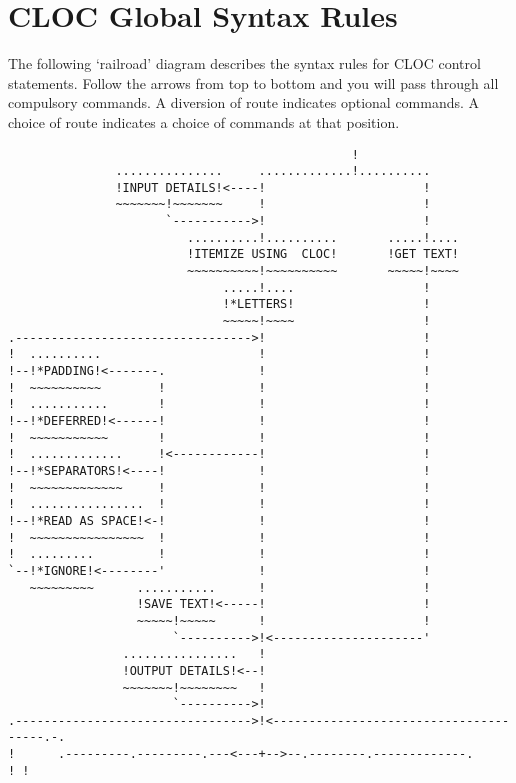 \section{CLOC Global Syntax Rules}
  The following `railroad' diagram describes the syntax rules for CLOC
  control statements. Follow the arrows from top to bottom and you will pass
  through all compulsory commands.  A diversion of route indicates
  optional commands.  A choice of route indicates a choice of commands
  at that position.
\begin{verbatim}
                                                !
               ...............     .............!..........
               !INPUT DETAILS!<----!                      !
               ~~~~~~~!~~~~~~~     !                      !
                      `----------->!                      !
                         ..........!..........       .....!....
                         !ITEMIZE USING  CLOC!       !GET TEXT!
                         ~~~~~~~~~~!~~~~~~~~~~       ~~~~~!~~~~
                              .....!....                  !
                              !*LETTERS!                  !
                              ~~~~~!~~~~                  !
.--------------------------------->!                      !
!  ..........                      !                      !
!--!*PADDING!<-------.             !                      !
!  ~~~~~~~~~~        !             !                      !
!  ...........       !             !                      !
!--!*DEFERRED!<------!             !                      !
!  ~~~~~~~~~~~       !             !                      !
!  .............     !<------------!                      !
!--!*SEPARATORS!<----!             !                      !
!  ~~~~~~~~~~~~~     !             !                      !
!  ................  !             !                      !
!--!*READ AS SPACE!<-!             !                      !
!  ~~~~~~~~~~~~~~~~  !             !                      !
!  .........         !             !                      !
`--!*IGNORE!<--------'             !                      !
   ~~~~~~~~~      ...........      !                      !
                  !SAVE TEXT!<-----!                      !
                  ~~~~~!~~~~~      !                      !
                       `---------->!<---------------------'
                ................   !
                !OUTPUT DETAILS!<--!
                ~~~~~~~!~~~~~~~~   !
                       `---------->!
.--------------------------------->!<--------------------------------------.-.
!      .---------.---------.---<---+-->--.--------.-------------.          ! !

\end{verbatim}
